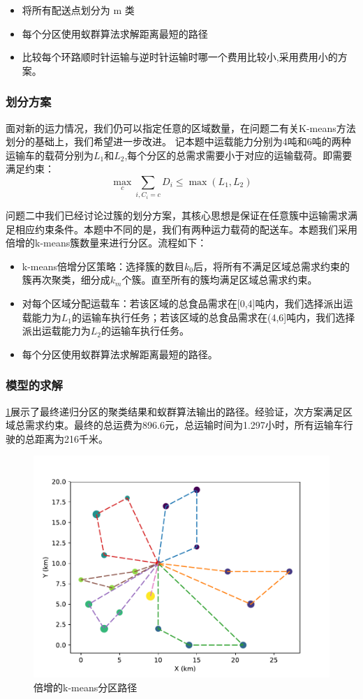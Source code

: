 \documentclass{cumcmthesis}
\begin{document}
    \begin{itemize}
        \item 将所有配送点划分为 m 类
        \item 每个分区使用蚁群算法求解距离最短的路径
        \item 比较每个环路顺时针运输与逆时针运输时哪一个费用比较小,采用费用小的方案。
    \end{itemize}

    \subsubsection{划分方案}
    面对新的运力情况，我们仍可以指定任意的区域数量，在问题二有关K-means方法划分的基础上，我们希望进一步改进。
    记本题中运载能力分别为4吨和6吨的两种运输车的载荷分别为$L_1$和$L_2$,每个分区的总需求需要小于对应的运输载荷。即需要满足约束：
    $$\max_{c}\sum_{i,C_i=c }{D_i} \leq \max(L_1, L_2)$$

    问题二中我们已经讨论过簇的划分方案，其核心思想是保证在任意簇中运输需求满足相应约束条件。本题中不同的是，我们有两种运力载荷的配送车。本题我们采用倍增的k-means簇数量来进行分区。流程如下：
    \begin{itemize}
        \item k-means倍增分区策略：选择簇的数目$k_0$后，将所有不满足区域总需求约束的簇再次聚类，细分成$k_m$个簇。直至所有的簇均满足区域总需求约束。
        \item 对每个区域分配运载车：若该区域的总食品需求在[0,4]吨内，我们选择派出运载能力为$L_1$的运输车执行任务；若该区域的总食品需求在(4,6]吨内，我们选择派出运载能力为$L_2$的运输车执行任务。
        \item 每个分区使用蚁群算法求解距离最短的路径。
        \end{itemize}
  

    \subsubsection{模型的求解}
    \cref{fig:path_mutiTSSheet2}展示了最终递归分区的聚类结果和蚁群算法输出的路径。经验证，次方案满足区域总需求约束。最终的总运费为896.6元，总运输时间为1.297小时，所有运输车行驶的总距离为216千米。
    \begin{figure}[!h]
        \centering
        \includegraphics[width=.7\textwidth]{figure//path_mutiTSSheet2.pdf}
        \caption{倍增的k-means分区路径}
        \label{fig:path_mutiTSSheet2}
    \end{figure}
\end{document}
